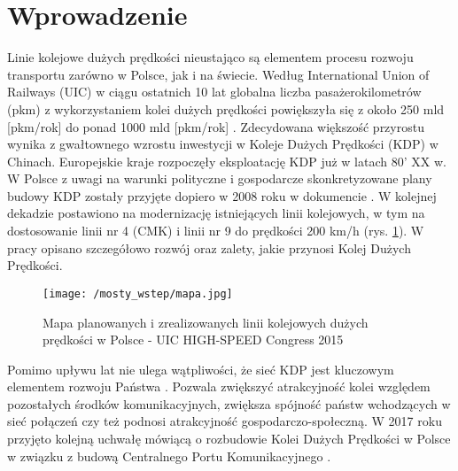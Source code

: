 


\chapter*{Wprowadzenie}

\setcounter{figure}{0} 

Linie kolejowe dużych prędkości nieustająco są elementem procesu rozwoju transportu zarówno w Polsce, jak i na świecie. Według International Union of Railways (UIC) w ciągu ostatnich 10 lat globalna liczba pasażerokilometrów (pkm) z wykorzystaniem kolei dużych prędkości powiększyła się z około 250 mld [pkm/rok] do ponad 1000 mld [pkm/rok] \parencite{UIC2021}. Zdecydowana większość przyrostu wynika z gwałtownego wzrostu inwestycji w Koleje Dużych Prędkości (KDP) w Chinach. Europejskie kraje rozpoczęły eksploatację KDP już w latach 80' XX w. W Polsce z uwagi na warunki polityczne i gospodarcze skonkretyzowane plany budowy KDP zostały przyjęte dopiero w 2008 roku w dokumencie \parencite{UchwaaNr276}. W kolejnej dekadzie postawiono na modernizację istniejących linii kolejowych, w tym na dostosowanie linii nr 4 (CMK) i linii nr 9 do prędkości 200 km/h (rys. \ref{fig:LDP_mapa}). W pracy \parencite{Towpik2010} opisano szczegółowo rozwój oraz zalety, jakie przynosi Kolej Dużych Prędkości. 

\begin{figure}[hbt!]
	\centering
	\texttt{[image: /mosty\_wstep/mapa.jpg]}
	\captionsetup{justification=centering}
	\caption{Mapa planowanych i zrealizowanych linii kolejowych dużych prędkości w Polsce - UIC HIGH-SPEED Congress 2015 \parencite{UIC2015}}
	\label{fig:LDP_mapa}
\end{figure}

Pomimo upływu lat nie ulega wątpliwości, że sieć KDP jest kluczowym elementem rozwoju Państwa \parencite{Raczynski2010}. Pozwala zwiększyć atrakcyjność kolei względem pozostałych środków komunikacyjnych, zwiększa spójność państw wchodzących w sieć połączeń czy też podnosi atrakcyjność gospodarczo-społeczną. W 2017 roku przyjęto kolejną uchwałę mówiącą o rozbudowie Kolei Dużych Prędkości w Polsce w związku z budową Centralnego Portu Komunikacyjnego \parencite{UchwaaNr173}. 


